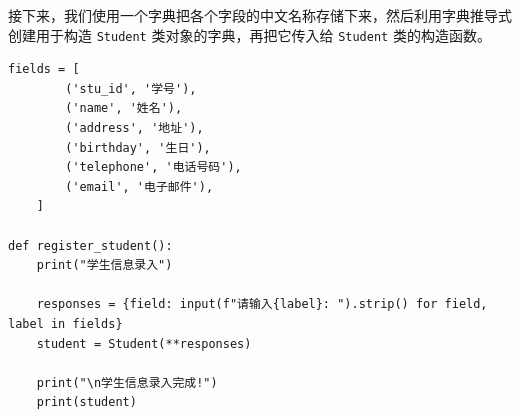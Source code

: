 \documentclass[openany, 10pt]{ctexart}
\begin{document}
接下来，我们使用一个字典把各个字段的中文名称存储下来，然后利用字典推导式创建用于构造 \lstinline|Student| 类对象的字典，再把它传入给 \lstinline|Student| 类的构造函数。
\begin{lstlisting}
fields = [
        ('stu_id', '学号'),
        ('name', '姓名'),
        ('address', '地址'),
        ('birthday', '生日'),
        ('telephone', '电话号码'),
        ('email', '电子邮件'),
    ]

def register_student():
    print("学生信息录入")

    responses = {field: input(f"请输入{label}: ").strip() for field, label in fields}
    student = Student(**responses)

    print("\n学生信息录入完成!")
    print(student)
\end{lstlisting}
\end{document}
